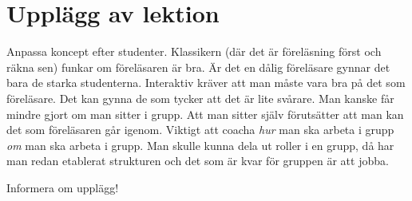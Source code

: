 \section{Upplägg av lektion}

\noindent Anpassa koncept efter studenter. Klassikern (där det är föreläsning först och räkna sen) funkar om föreläsaren är bra. Är det en dålig föreläsare gynnar det bara de starka studenterna. Interaktiv kräver att man måste vara bra på det som föreläsare. Det kan gynna de som tycker att det är lite svårare. Man kanske får mindre gjort om man sitter i grupp. Att man sitter själv förutsätter att man kan det som föreläsaren går igenom. Viktigt att coacha \textit{hur} man ska arbeta i grupp \textit{om} man ska arbeta i grupp. Man skulle kunna dela ut roller i en grupp, då har man redan etablerat strukturen och det som är kvar för gruppen är att jobba.  
\par\bigskip
\noindent Informera om upplägg!
